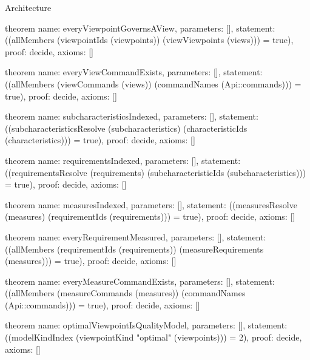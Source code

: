 \begin{lexlean}{Architecture}
\begin{semanticmodule}
theorem{
  name: everyViewpointGovernsAView,
  parameters: [],
  statement: ((allMembers (viewpointIds (viewpoints)) (viewViewpoints (views))) = true),
  proof: decide{},
  axioms: []
}

theorem{
  name: everyViewCommandExists,
  parameters: [],
  statement: ((allMembers (viewCommands (views)) (commandNames (Api::commands))) = true),
  proof: decide{},
  axioms: []
}

theorem{
  name: subcharacteristicsIndexed,
  parameters: [],
  statement: ((subcharacteristicsResolve (subcharacteristics) (characteristicIds (characteristics))) = true),
  proof: decide{},
  axioms: []
}

theorem{
  name: requirementsIndexed,
  parameters: [],
  statement: ((requirementsResolve (requirements) (subcharacteristicIds (subcharacteristics))) = true),
  proof: decide{},
  axioms: []
}

theorem{
  name: measuresIndexed,
  parameters: [],
  statement: ((measuresResolve (measures) (requirementIds (requirements))) = true),
  proof: decide{},
  axioms: []
}

theorem{
  name: everyRequirementMeasured,
  parameters: [],
  statement: ((allMembers (requirementIds (requirements)) (measureRequirements (measures))) = true),
  proof: decide{},
  axioms: []
}

theorem{
  name: everyMeasureCommandExists,
  parameters: [],
  statement: ((allMembers (measureCommands (measures)) (commandNames (Api::commands))) = true),
  proof: decide{},
  axioms: []
}

theorem{
  name: optimalViewpointIsQualityModel,
  parameters: [],
  statement: ((modelKindIndex (viewpointKind "optimal" (viewpoints))) = 2),
  proof: decide{},
  axioms: []
}
\end{semanticmodule}
\end{lexlean}
